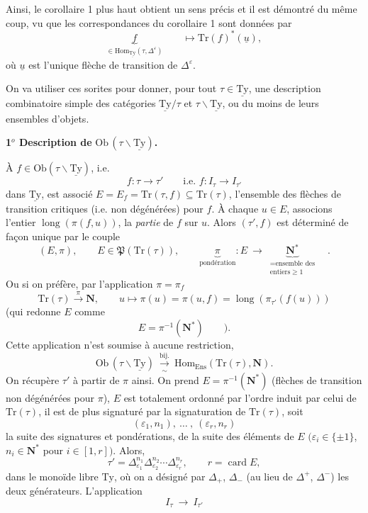 \documentclass[11pt]{article}
\newcommand{\printedpage}[1]{\marginpar{\footnotesize p.~#1}}
\newcommand{\msp}[1]{\marginpar{\footnotesize [#1]}}
\newcommand{\Tr}{\mathrm{Tr}}
\newcommand{\Hom}{\mathrm{Hom}}
\newcommand{\Ob}{\mathrm{Ob}}
\newcommand{\lng}{\operatorname{long}}
\newcommand{\card}{\operatorname{card}}
\newcommand{\uTy}{\underline{\mathrm{Ty}}}
\begin{document}
\printedpage{28}

Ainsi, le corollaire 1 plus haut obtient un sens précis et il est démontré du même coup, vu que les correspondances du corollaire 1 sont données par
\[
\underbrace{f}_{\in \Hom_{\uTy}(\tau, \Delta^{\varepsilon})} \qquad \longmapsto \Tr(f)^*(\underline{u}),
\]
où $\underline{u}$ est l'unique flèche de transition de $\Delta^{\varepsilon}$.

On va utiliser ces sorites pour donner, pour tout $\tau \in \uTy$, une description combinatoire simple des catégories $\uTy/\tau$ et $\tau\backslash\uTy$, ou du moins de leurs ensembles d'objets.

\textbf{1$^o$ Description de} $\Ob\,(\tau\backslash\uTy)$\textbf{.}

À $f \in \Ob(\tau\backslash\uTy)$, i.e.
\[
f : \tau \longrightarrow \tau' \qquad \text{i.e. } f : I_\tau \longrightarrow I_{\tau'}
\]
dans $\uTy$, est associé $E = E_f = \Tr(\tau, f) \subseteq \Tr(\tau)$, l'ensemble des flèches de transition critiques (i.e. non dégénérées) pour $f$. À chaque $u \in E$, associons l'entier $\lng(\pi(f, u))$,
\msp{page 44}
la \textit{partie} de $f$ sur $u$. Alors $(\tau', f)$ est déterminé de façon unique par le couple
\[
(E, \pi), \qquad E \in \mathfrak{P}(\Tr(\tau)), \qquad \underbrace{\pi}_{\text{pondération}} : E \ \longrightarrow\ \underbrace{\mathbf{N}^*}_{\substack{= \text{ensemble des} \\ \text{entiers} \geq 1}} \quad .
\]
Ou si on préfère, par l'application $\pi = \pi_f$
\[
\Tr(\tau) \xrightarrow{\pi} \mathbf{N}, \qquad u \longmapsto \pi(u) = \pi(u, f) = \lng(\pi_{\tau'}(f(u)))
\]
(qui redonne $E$ comme
\[
E = \pi^{-1}(\mathbf{N}^*) \qquad ).
\]
Cette application n'est soumise à aucune restriction,
\[
\Ob\,(\tau\backslash\uTy) \ \xrightarrow[\sim]{\text{bij.}}\ \Hom_{\mathrm{Ens}}(\Tr(\tau), \mathbf{N}).
\]
On récupère $\tau'$ à partir de $\pi$ ainsi. On prend $E = \pi^{-1}(\mathbf{N}^*)$ (flèches de transition non dégénérées pour $\pi$), $E$ est totalement ordonné par l'ordre induit par celui de $\Tr(\tau)$, il est de plus signaturé par la signaturation de $\Tr(\tau)$, soit
\[
(\varepsilon_1, n_1),\ \dots\ ,\ (\varepsilon_r, n_r)
\]
la suite des signatures et pondérations, de la suite des éléments de $E$ $(\varepsilon_i \in \{\pm 1\}$, $n_i \in \mathbf{N}^*$ pour $i \in [1, r])$. Alors,
\[
\tau' = \Delta_{\varepsilon_1}^{n_1} \Delta_{\varepsilon_2}^{n_2} \cdots \Delta_{\varepsilon_r}^{n_r}, \qquad r = \card E,
\]
dans le monoïde libre $\mathrm{Ty}$, où on a désigné par $\Delta_+$, $\Delta_-$ (au lieu de $\Delta^+$, $\Delta^-$) les deux générateurs. L'application
\[
I_\tau \ \longrightarrow\ I_{\tau'}
\]
\end{document}
